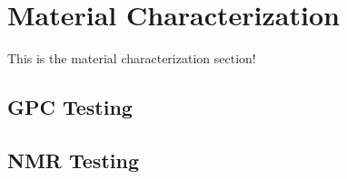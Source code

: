 \section{Material Characterization\label{methedology:materialCharacterization}}
This is the material characterization section!

\subsection{GPC Testing\label{sec:methedology:gpcTesting}}

\subsection{NMR Testing\label{sec:methedology:nmrTesting}}
